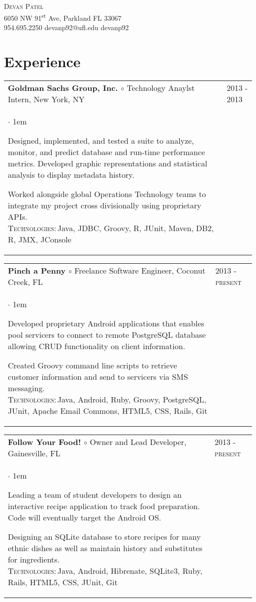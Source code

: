 \documentclass[11pt]{article}
\makeatletter
\newcommand{\employer}[4]
	{{ \begin{tabular}{l@{\hspace{5mm}}|p{30mm}}
	   \multicolumn{1}{l}{\textbf{#1 $\circ$ }#2}&\multicolumn{1}{p{30mm}}{\hspace{-3mm}\textsc{#3}} \\
	   \parbox{.825\textwidth}{#4 \vspace*{-4pt}}
	   \end{tabular} \vspace{4pt} }}
\newcommand{\contact}[5]
	{\begin{center}
		{\LARGE \scshape{#1}}\\
		#2\\
		\Telefon \hspace{0.5ex} #3 \hspace{1em} \Letter \hspace{0.5ex} #4 \hspace{1em} \faGithub \hspace{0.5ex} #5
	\end{center}
	\vspace*{-8pt}}
\newenvironment{achievements}           %
	{\begin{list}{$\cdot$}{\topsep 0pt \itemsep 4pt \parsep 0pt \leftmargin 1em}
	 \linespread{1.05} \selectfont %
	}
	{\end{list}\vspace*{4pt}}
\def\kt{\vspace*{2pt}\\\textsc{Technologies:\,}}
\makeatother
\begin{document}
\contact{Devan Patel}
{6050 NW 91\textsuperscript{st} Ave, Parkland FL 33067}
{954.695.2250}
{devanp92@ufl.edu}
{devanp92}
\section{Experience}
\employer{Goldman Sachs Group, Inc.}{Technology Anaylst Intern, New York, NY}{2013 - 2013}{
	\begin{achievements}
	
	\item{Designed, implemented, and tested a suite to analyze, monitor, and predict database and run-time performance metrics. Developed graphic representations and statistical analysis to display metadata history.}
		
	\item{Worked alongside global Operations Technology teams to integrate my project cross divisionally using proprietary APIs.\kt Java, JDBC, Groovy, R, JUnit, Maven, DB2, R, JMX, JConsole}

	\end{achievements} 
}


\employer{Pinch a Penny}{Freelance Software Engineer, Coconut Creek, FL}{2013 - present}{
	\begin{achievements}
	
	\item{Developed proprietary Android applications that enables pool servicers to connect to remote PostgreSQL database allowing CRUD functionality on client information. }
	
	\item{Created Groovy command line scripts to retrieve customer information and send to servicers via SMS messaging.  \kt Java, Android, Ruby, Groovy, PostgreSQL, JUnit, Apache Email Commons, HTML5, CSS, Rails, Git}
	
	\end{achievements}
}

\employer{Follow Your Food!}{Owner and Lead Developer, Gainesville, FL}{2013 - present}{
	\begin{achievements}
	
	\item{Leading a team of student developers to design an interactive recipe application to track food preparation. Code will eventually target the Android OS.}
	
	\item{Designing an SQLite database to store recipes for many ethnic dishes as well as maintain history and substitutes for ingredients.\kt Java, Android, Hibrenate, SQLite3, Ruby, Rails, HTML5, CSS, JUnit, Git}
	
	\end{achievements}
}
\end{document}
